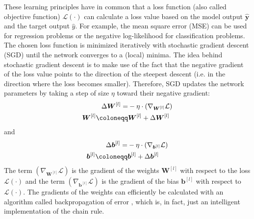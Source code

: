 These learning principles have in common that a loss function (also called objective function) $\mathcal{L}(\cdot)$ can calculate a loss value based on the model output $\boldsymbol{\hat{y}}$ and the target output ${\hat{y}}$. For example, the mean square error (MSE) can be used for regression problems or the negative log-likelihood for classification problems.
The chosen loss function is minimized iteratively with stochastic gradient descent (SGD) until the network converges to a (local) minima.
The idea behind stochastic gradient descent is to make use of the fact that the negative gradient of the loss value points to the direction of the steepest descent (i.e. in the direction where the loss becomes smaller).
Therefore, SGD updates the network parameters by taking a step of size $\eta$ toward their negative gradient:
%
\begin{equation}\eqlbl{sgd}
	\begin{aligned}
		\Delta \boldsymbol{W}^{[l]} = & -\eta \cdot \left( \nabla_{\boldsymbol{W}^{[l]}} \mathcal{L} \right)\\
		\boldsymbol{W}^{[l]} \coloneqq & \boldsymbol{W}^{[l]} + \Delta \boldsymbol{W}^{[l]}
	\end{aligned}
\end{equation}
%
and
%	
\begin{equation}\eqlbl{sgd2}	
	\begin{aligned}
		\Delta \boldsymbol{b}^{[l]} = & -\eta \cdot \left( \nabla_{\boldsymbol{b}^{[l]}} \mathcal{L} \right)\\
		\boldsymbol{b}^{[l]} \coloneqq & \boldsymbol{b}^{[l]} + \Delta \boldsymbol{b}^{[l]}
	\end{aligned}
\end{equation}
%
The term $\left( \nabla_{\boldsymbol{W}^{[l]}} \mathcal{L} \right)$ is the gradient of the weights \(\boldsymbol{W}^{[l]}\)  with respect to the loss $\mathcal{L}(\cdot)$ and the term $\left( \nabla_{\boldsymbol{b}^{[l]}} \mathcal{L} \right)$ is the gradient of the bias \(\boldsymbol{b}^{[l]}\)  with respect to $\mathcal{L}(\cdot)$.
The gradients of the weights can efficiently be calculated with an algorithm called backpropagation of error , which is, in fact, just an intelligent implementation of the chain rule.

